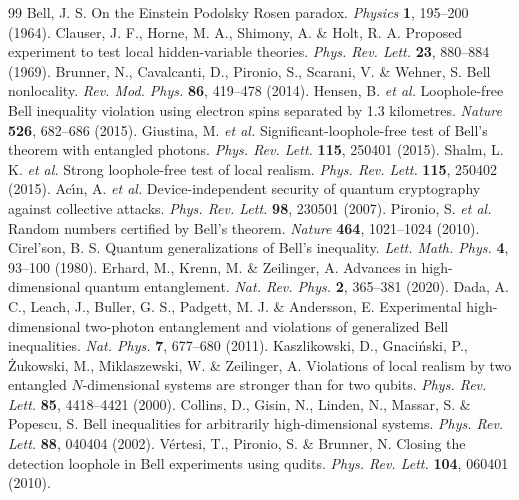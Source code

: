 \begin{thebibliography}{99}
\setlength{\itemsep}{1pt}
 Bell, J. S. On the Einstein Podolsky Rosen paradox. \textit{Physics} \textbf{1}, 195--200 (1964).
 Clauser, J. F., Horne, M. A., Shimony, A. \& Holt, R. A. Proposed experiment to test local hidden-variable theories. \textit{Phys. Rev. Lett.} \textbf{23}, 880--884 (1969).
 Brunner, N., Cavalcanti, D., Pironio, S., Scarani, V. \& Wehner, S. Bell nonlocality. \textit{Rev. Mod. Phys.} \textbf{86}, 419--478 (2014).
 Hensen, B. \textit{et al.} Loophole-free Bell inequality violation using electron spins separated by 1.3 kilometres. \textit{Nature} \textbf{526}, 682--686 (2015).
 Giustina, M. \textit{et al.} Significant-loophole-free test of Bell's theorem with entangled photons. \textit{Phys. Rev. Lett.} \textbf{115}, 250401 (2015).
 Shalm, L. K. \textit{et al.} Strong loophole-free test of local realism. \textit{Phys. Rev. Lett.} \textbf{115}, 250402 (2015).
 Ac\'{\i}n, A. \textit{et al.} Device-independent security of quantum cryptography against collective attacks. \textit{Phys. Rev. Lett.} \textbf{98}, 230501 (2007).
 Pironio, S. \textit{et al.} Random numbers certified by Bell's theorem. \textit{Nature} \textbf{464}, 1021--1024 (2010).
 Cirel'son, B. S. Quantum generalizations of Bell's inequality. \textit{Lett. Math. Phys.} \textbf{4}, 93--100 (1980).
 Erhard, M., Krenn, M. \& Zeilinger, A. Advances in high-dimensional quantum entanglement. \textit{Nat. Rev. Phys.} \textbf{2}, 365--381 (2020).
 Dada, A. C., Leach, J., Buller, G. S., Padgett, M. J. \& Andersson, E. Experimental high-dimensional two-photon entanglement and violations of generalized Bell inequalities. \textit{Nat. Phys.} \textbf{7}, 677--680 (2011).
 Kaszlikowski, D., Gnaci\'{n}ski, P., \.{Z}ukowski, M., Miklaszewski, W. \& Zeilinger, A. Violations of local realism by two entangled $N$-dimensional systems are stronger than for two qubits. \textit{Phys. Rev. Lett.} \textbf{85}, 4418--4421 (2000).
 Collins, D., Gisin, N., Linden, N., Massar, S. \& Popescu, S. Bell inequalities for arbitrarily high-dimensional systems. \textit{Phys. Rev. Lett.} \textbf{88}, 040404 (2002).
 V\'{e}rtesi, T., Pironio, S. \& Brunner, N. Closing the detection loophole in Bell experiments using qudits. \textit{Phys. Rev. Lett.} \textbf{104}, 060401 (2010).

\end{thebibliography}
